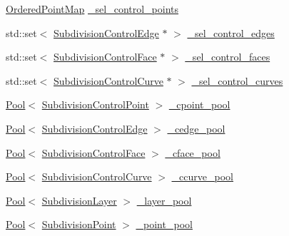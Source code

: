 \begin{DoxyCompactItemize}
\item 
\hyperlink{classOrderedPointMap}{Ordered\+Point\+Map} \hyperlink{classShipCAD_1_1SubdivisionSurface_a891ade2e87969ef453edcf712b1fe276}{\+\_\+sel\+\_\+control\+\_\+points}
\item 
std\+::set$<$ \hyperlink{classShipCAD_1_1SubdivisionControlEdge}{Subdivision\+Control\+Edge} $\ast$ $>$ \hyperlink{classShipCAD_1_1SubdivisionSurface_ad0d5f7d595c9b1f878cc6406ba58e718}{\+\_\+sel\+\_\+control\+\_\+edges}
\item 
std\+::set$<$ \hyperlink{classShipCAD_1_1SubdivisionControlFace}{Subdivision\+Control\+Face} $\ast$ $>$ \hyperlink{classShipCAD_1_1SubdivisionSurface_ac169ec4cb0e9b27ce1f425502b5c5d3a}{\+\_\+sel\+\_\+control\+\_\+faces}
\item 
std\+::set$<$ \hyperlink{classShipCAD_1_1SubdivisionControlCurve}{Subdivision\+Control\+Curve} $\ast$ $>$ \hyperlink{classShipCAD_1_1SubdivisionSurface_abeb17606808d7eddb3917735bc8ac2bd}{\+\_\+sel\+\_\+control\+\_\+curves}
\item 
\hyperlink{classPool}{Pool}$<$ \hyperlink{classShipCAD_1_1SubdivisionControlPoint}{Subdivision\+Control\+Point} $>$ \hyperlink{classShipCAD_1_1SubdivisionSurface_a795f2f16f1da4aa5c0f14d441a190ce0}{\+\_\+cpoint\+\_\+pool}
\item 
\hyperlink{classPool}{Pool}$<$ \hyperlink{classShipCAD_1_1SubdivisionControlEdge}{Subdivision\+Control\+Edge} $>$ \hyperlink{classShipCAD_1_1SubdivisionSurface_ad6607443a90f57a3d67a8c6b92c0a46f}{\+\_\+cedge\+\_\+pool}
\item 
\hyperlink{classPool}{Pool}$<$ \hyperlink{classShipCAD_1_1SubdivisionControlFace}{Subdivision\+Control\+Face} $>$ \hyperlink{classShipCAD_1_1SubdivisionSurface_abdb812e2df0e8f1c80242e7e4f5d709b}{\+\_\+cface\+\_\+pool}
\item 
\hyperlink{classPool}{Pool}$<$ \hyperlink{classShipCAD_1_1SubdivisionControlCurve}{Subdivision\+Control\+Curve} $>$ \hyperlink{classShipCAD_1_1SubdivisionSurface_a5aea3b12c1d7f9903e2503f3b3cb4392}{\+\_\+ccurve\+\_\+pool}
\item 
\hyperlink{classPool}{Pool}$<$ \hyperlink{classShipCAD_1_1SubdivisionLayer}{Subdivision\+Layer} $>$ \hyperlink{classShipCAD_1_1SubdivisionSurface_ad32ad62ece5a7a0b0268913e2b314969}{\+\_\+layer\+\_\+pool}
\item 
\hyperlink{classPool}{Pool}$<$ \hyperlink{classShipCAD_1_1SubdivisionPoint}{Subdivision\+Point} $>$ \hyperlink{classShipCAD_1_1SubdivisionSurface_a58736ba52015c2d17f0c67ba12406699}{\+\_\+point\+\_\+pool}
\item 

\end{DoxyCompactItemize}
